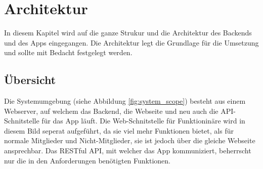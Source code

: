 %
%

\chapter{Architektur}\label{chap.architektur}
In diesem Kapitel wird auf die ganze Strukur und die Architektur des Backends und des Apps eingegangen. Die Architektur legt die Grundlage für die Umsetzung und sollte mit Bedacht festgelegt werden.

\section{Übersicht}\label{architektur_uebersicht}
Die Systemumgebung (siehe Abbildung \ref{fig:system_scope}) besteht aus einem Webserver, auf welchem das Backend, die Webseite und neu auch die API-Schnitstelle für das App läuft. Die Web-Schnitstelle für Funktioninäre wird in diesem Bild seperat aufgeführt, da sie viel mehr Funktionen bietet, als für normale Mitglieder und Nicht-Mitglieder, sie ist jedoch über die gleiche Webseite ansprechbar. Das RESTful API, mit welcher das App kommuniziert, beherrscht nur die in den Anforderungen benötigten Funktionen.

